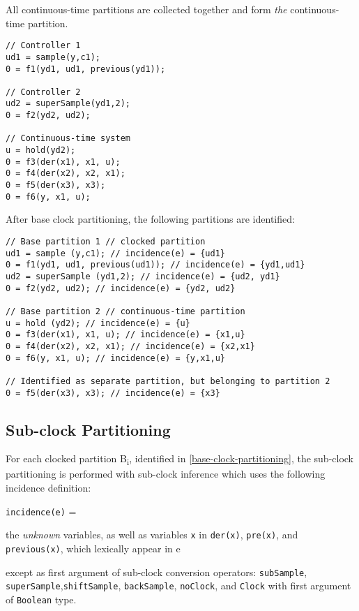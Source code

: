 All continuous-time partitions are collected together and form \emph{the} continuous-time partition.

\begin{example}
\begin{lstlisting}[language=modelica]
// Controller 1
ud1 = sample(y,c1);
0 = f1(yd1, ud1, previous(yd1));

// Controller 2
ud2 = superSample(yd1,2);
0 = f2(yd2, ud2);

// Continuous-time system
u = hold(yd2);
0 = f3(der(x1), x1, u);
0 = f4(der(x2), x2, x1);
0 = f5(der(x3), x3);
0 = f6(y, x1, u);
\end{lstlisting}

After base clock partitioning, the following partitions are identified:
\begin{lstlisting}[language=modelica]
// Base partition 1 // clocked partition
ud1 = sample (y,c1); // incidence(e) = {ud1}
0 = f1(yd1, ud1, previous(ud1)); // incidence(e) = {yd1,ud1}
ud2 = superSample (yd1,2); // incidence(e) = {ud2, yd1}
0 = f2(yd2, ud2); // incidence(e) = {yd2, ud2}

// Base partition 2 // continuous-time partition
u = hold (yd2); // incidence(e) = {u}
0 = f3(der(x1), x1, u); // incidence(e) = {x1,u}
0 = f4(der(x2), x2, x1); // incidence(e) = {x2,x1}
0 = f6(y, x1, u); // incidence(e) = {y,x1,u}

// Identified as separate partition, but belonging to partition 2
0 = f5(der(x3), x3); // incidence(e) = {x3}
\end{lstlisting}
\end{example}

\subsection{Sub-clock Partitioning}\label{sub-clock-partitioning}

For each clocked partition B\textsubscript{i}, identified in
\cref{base-clock-partitioning}, the sub-clock partitioning is performed with sub-clock inference
which uses the following incidence definition:

\lstinline!incidence(e)! =
\begin{list}{}{\setlength{\leftmargin}{2em}\setlength{\topsep}{-\parskip}}
\item
the \emph{unknown} variables, as well as variables \lstinline!x! in \lstinline!der(x)!, \lstinline!pre(x)!, and \lstinline!previous(x)!, which lexically appear in e
\begin{list}{}{\setlength{\leftmargin}{2em}\setlength{\topsep}{-\parskip}}
\item
except as first argument of sub-clock conversion operators: \lstinline!subSample!, \lstinline!superSample!,\linebreak[4] \lstinline!shiftSample!, \lstinline!backSample!, \lstinline!noClock!, and \lstinline!Clock! with first argument of \lstinline!Boolean! type.
\end{list}
\end{list}\vspace{\parskip}%

